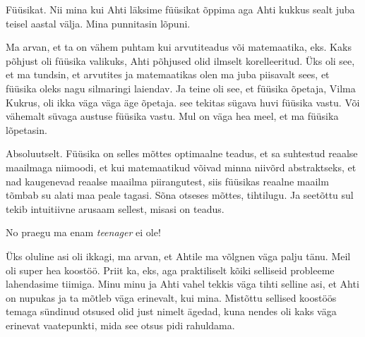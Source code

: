 Füüsikat. Nii mina kui Ahti läksime füüsikat õppima aga Ahti kukkus sealt juba teisel aastal välja. Mina punnitasin lõpuni. 


Ma arvan, et ta on vähem puhtam kui arvutiteadus või matemaatika, eks. Kaks põhjust oli füüsika valikuks, Ahti põhjused olid ilmselt korelleeritud. Üks oli see, et ma tundsin, et  arvutites ja matemaatikas olen ma juba piisavalt sees, et füüsika oleks nagu silmaringi laiendav. Ja teine oli see, et füüsika õpetaja, Vilma Kukrus, oli ikka väga väga äge õpetaja. see tekitas sügava huvi füüsika vastu. Või vähemalt süvaga austuse füüsika vastu. Mul on väga hea meel, et ma füüsika lõpetasin.


Absoluutselt. Füüsika on selles mõttes optimaalne teadus, et sa suhtestud reaalse maailmaga niimoodi, et kui matemaatikud võivad minna niivõrd abstraktseks, et nad kaugenevad reaalse maailma piirangutest, siis füüsikas reaalne maailm tõmbab su alati maa peale tagasi. Sõna otseses mõttes, tihtilugu. Ja seetõttu sul tekib intuitiivne arusaam sellest, misasi on teadus. 


No praegu ma enam \emph{teenager} ei ole!


Üks oluline asi oli ikkagi, ma arvan, et Ahtile ma võlgnen väga palju tänu. Meil oli super hea koostöö. Priit ka, eks, aga praktiliselt kõiki selliseid probleeme lahendasime tiimiga. Minu minu ja Ahti vahel tekkis väga tihti selline asi, et Ahti on nupukas ja ta mõtleb väga erinevalt, kui mina. Mistõttu  sellised koostöös temaga sündinud otsused olid just nimelt ägedad, kuna nendes oli kaks väga erinevat vaatepunkti, mida see otsus pidi rahuldama.


